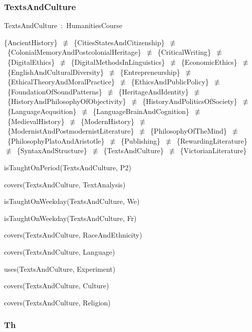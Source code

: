 \documentclass{article}
\begin{document}
\subsubsection*{TextsAndCulture}

TextsAndCulture~:~HumanitiesCourse

\{AncientHistory\}~\ensuremath{\not\equiv}~\{CitiesStatesAndCitizenship\}~\ensuremath{\not\equiv}~\{ColonialMemoryAndPostcolonialHeritage\}~\ensuremath{\not\equiv}~\{CriticalWriting\}~\ensuremath{\not\equiv}~\{DigitalEthics\}~\ensuremath{\not\equiv}~\{DigitalMethodsInLinguistics\}~\ensuremath{\not\equiv}~\{EconomicEthics\}~\ensuremath{\not\equiv}~\{EnglishAndCulturalDiversity\}~\ensuremath{\not\equiv}~\{Entrepreneurship\}~\ensuremath{\not\equiv}~\{EthicalTheoryAndMoralPractice\}~\ensuremath{\not\equiv}~\{EthicsAndPublicPolicy\}~\ensuremath{\not\equiv}~\{FoundationOfSoundPatterns\}~\ensuremath{\not\equiv}~\{HeritageAndIdentity\}~\ensuremath{\not\equiv}~\{HistoryAndPhilosophyOfObjectivity\}~\ensuremath{\not\equiv}~\{HistoryAndPoliticsOfSociety\}~\ensuremath{\not\equiv}~\{LanguageAcqusition\}~\ensuremath{\not\equiv}~\{LanguageBrainAndCognition\}~\ensuremath{\not\equiv}~\{MedievalHistory\}~\ensuremath{\not\equiv}~\{ModernHistory\}~\ensuremath{\not\equiv}~\{ModernistAndPostmodernistLiterature\}~\ensuremath{\not\equiv}~\{PhilosophyOfTheMind\}~\ensuremath{\not\equiv}~\{PhilosophyPlatoAndAristotle\}~\ensuremath{\not\equiv}~\{Publishing\}~\ensuremath{\not\equiv}~\{RewardingLiterature\}~\ensuremath{\not\equiv}~\{SyntaxAndStructure\}~\ensuremath{\not\equiv}~\{TextsAndCulture\}~\ensuremath{\not\equiv}~\{VictorianLiterature\}

isTaughtOnPeriod(TextsAndCulture, P2)

covers(TextsAndCulture, TextAnalysis)

isTaughtOnWeekday(TextsAndCulture, We)

isTaughtOnWeekday(TextsAndCulture, Fr)

covers(TextsAndCulture, RaceAndEthnicity)

covers(TextsAndCulture, Language)

uses(TextsAndCulture, Experiment)

covers(TextsAndCulture, Culture)

covers(TextsAndCulture, Religion)

\subsubsection*{Th}
\end{document}
